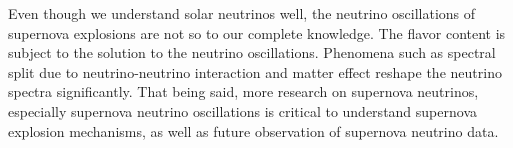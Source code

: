 Even though we understand solar neutrinos well, the neutrino oscillations of supernova explosions are not so to our complete knowledge. The flavor content is subject to the solution to the neutrino oscillations. Phenomena such as spectral split due to neutrino-neutrino interaction and matter effect reshape the neutrino spectra significantly. That being said, more research on supernova neutrinos, especially supernova neutrino oscillations is critical to understand supernova explosion mechanisms, as well as future observation of supernova neutrino data.



